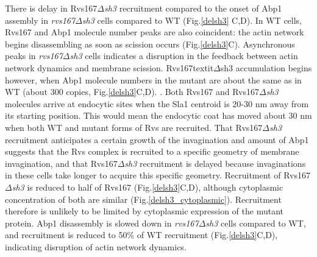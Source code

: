 \documentclass[9pt,lineno]{elife}
\begin{document}
There is delay in Rvs167\textit{$\Delta$sh3} recruitment compared to the onset of Abp1 assembly in \textit{rvs167$\Delta$sh3} cells compared to WT (Fig.\ref{delsh3} C,D). In WT cells, Rvs167 and Abp1 molecule number peaks are also coincident: the actin network begins disassembling as soon as scission occurs (Fig.\ref{delsh3}C). Asynchronous peaks in \textit{rvs167$\Delta$sh3} cells indicates a disruption in the feedback between actin network dynamics and membrane scission. Rvs167textit{$\Delta$sh3} accumulation begins however, when Abp1 molecule numbers in the mutant are about the same as in WT (about 300 copies, Fig.\ref{delsh3}C,D). . Both Rvs167 and Rvs167\textit{$\Delta$sh3} molecules arrive at endocytic sites when the Sla1 centroid is 20-30 nm away from its starting position. This would mean the endocytic coat has moved about 30 nm when both WT and mutant forms of Rvs are recruited. That Rvs167\textit{$\Delta$sh3} recruitment anticipates a certain growth of the invagination and amount of Abp1 suggests that the Rvs complex is recruited to a specific geometry of membrane invagination, and that Rvs167\textit{$\Delta$sh3} recruitment is delayed because invaginations in these cells take longer to acquire this specific geometry. Recruitment of Rvs167\textit{$\Delta$sh3}  is reduced to half of Rvs167 (Fig.\ref{delsh3}C,D), although cytoplasmic concentration of both are similar (Fig.\ref{delsh3_cytoplasmic}). Recruitment therefore is unlikely to be limited by cytoplasmic expression of the mutant protein. Abp1 disassembly is slowed down in \textit{rvs167$\Delta$sh3} cells compared to WT, and recruitment is reduced to 50\% of WT recruitment (Fig.\ref{delsh3}C,D), indicating disruption of actin network dynamics.

	
\end{document}
